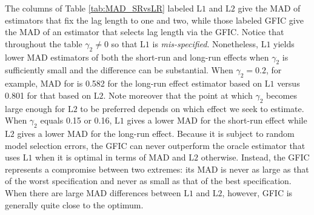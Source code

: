 The columns of Table \ref{tab:MAD_SRvsLR} labeled $\mbox{L1}$ and $\mbox{L2}$ give the MAD of estimators that fix the lag length to one and two, while those labeled GFIC give the MAD of an estimator that selects lag length via the GFIC.
Notice that throughout the table $\gamma_2 \neq 0$ so that $\mbox{L1}$ is \emph{mis-specified}.
Nonetheless, $\mbox{L1}$ yields lower MAD estimators of both the short-run and long-run effects when $\gamma_2$ is sufficiently small and the difference can be substantial.
When $\gamma_2 = 0.2$, for example, MAD for is 0.582 for the long-run effect estimator based on $\mbox{L1}$ versus 0.801 for that based on $\mbox{L2}$.
Note moreover that the point at which $\gamma_2$ becomes large enough for $\mbox{L2}$ to be preferred depends on which effect we seek to estimate.
When $\gamma_2$ equals 0.15 or 0.16, $\mbox{L1}$ gives a lower MAD for the short-run effect while $\mbox{L2}$ gives a lower MAD for the long-run effect.
Because it is subject to random model selection errors, the GFIC can never outperform the oracle estimator that uses $\mbox{L1}$ when it is optimal in terms of MAD and $\mbox{L2}$ otherwise.
Instead, the GFIC represents a compromise between two extremes: its MAD is never as large as that of the worst specification and never as small as that of the best specification.
When there are large MAD differences between $\mbox{L1}$ and $\mbox{L2}$, however, GFIC is generally quite close to the optimum.


